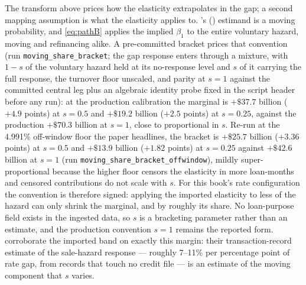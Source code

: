 \documentclass[12pt]{article}
\newcommand{\citepos}[1]{\citeauthor{#1}'s (\citeyear{#1})}
\begin{document}
The transform above prices how the elasticity extrapolates in the gap; a second mapping assumption is what the elasticity applies to. \citepos{liebersohn2024} estimand is a moving probability, and \eqref{eq:pathB} applies the implied $\beta_1$ to the entire voluntary hazard, moving and refinancing alike. A pre-committed bracket prices that convention (run \texttt{moving\_share\_bracket}; the gap response enters through a mixture, with $1-s$ of the voluntary hazard held at its no-response level and $s$ of it carrying the full response, the turnover floor unscaled, and parity at $s = 1$ against the committed central leg plus an algebraic identity probe fixed in the script header before any run): at the production calibration the marginal is $+\$37.7$ billion ($+4.9$ points) at $s = 0.5$ and $+\$19.2$ billion ($+2.5$ points) at $s = 0.25$, against the production $+\$70.3$ billion at $s = 1$, close to proportional in $s$. Re-run at the 4.991\% off-window floor the paper headlines, the bracket is $+\$25.7$ billion ($+3.36$ points) at $s = 0.5$ and $+\$13.9$ billion ($+1.82$ points) at $s = 0.25$ against $+\$42.6$ billion at $s = 1$ (run \texttt{moving\_share\_bracket\_offwindow}), mildly super-proportional because the higher floor censors the elasticity in more loan-months and censored contributions do not scale with $s$. For this book's rate configuration the convention is therefore signed: applying the imported elasticity to less of the hazard can only shrink the marginal, and by roughly its share. No loan-purpose field exists in the ingested data, so $s$ is a bracketing parameter rather than an estimate, and the production convention $s = 1$ remains the reported form. \citet{graybill2026} corroborate the imported band on exactly this margin: their transaction-record estimate of the sale-hazard response --- roughly 7--11\% per percentage point of rate gap, from records that touch no credit file --- is an estimate of the moving component that $s$ varies.
\end{document}
